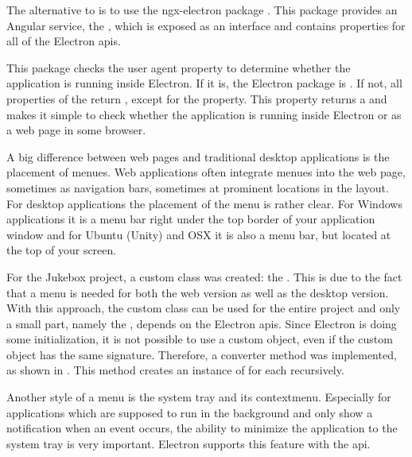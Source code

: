 
The alternative to  is to use the ngx-electron package \cite{ngxElectron}. This package provides an Angular service, the , which is exposed as an interface and contains properties for all of the Electron \gls{api}s.

This package checks the user agent property to determine whether the application is running inside Electron. If it is, the Electron package is . If not, all properties of the  return , except for the  property. This property returns a  and makes it simple to check whether the application is running inside Electron or as a web page in some browser.


A big difference between web pages and traditional desktop applications is the placement of menues. Web applications often integrate menues into the web page, sometimes as navigation bars, sometimes at prominent locations in the layout. For desktop applications the placement of the menu is rather clear. For Windows applications it is a menu bar right under the top border of your application window and for Ubuntu (Unity) and OSX it is also a menu bar, but located at the top of your screen.



For the Jukebox project, a custom  class was created: the . This is due to the fact that a menu is needed for both the web version as well as the desktop version. With this approach, the custom class can be used for the entire project and only a small part, namely the , depends on the Electron \gls{api}s. Since Electron is doing some initialization, it is not possible to use a custom  object, even if the custom object has the same signature. Therefore, a converter method was implemented, as shown in . This method creates an instance of  for each  recursively.



Another style of a menu is the system tray and its contextmenu. Especially for applications which are supposed to run in the background and only show a notification when an event occurs, the ability to minimize the application to the system tray is very important. Electron supports this feature with the  \gls{api}.

